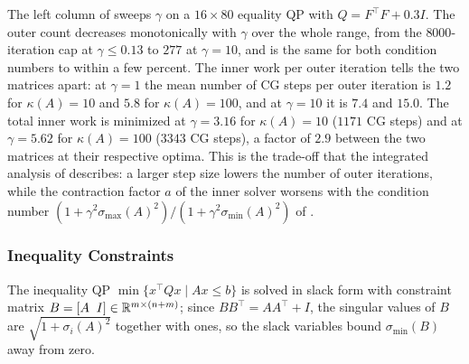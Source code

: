 \documentclass[11pt]{article}
\begin{document}
The left column of  sweeps $\gamma$ on a $16 \times 80$ equality QP with $Q = F^\top F + 0.3 I$.
The outer count decreases monotonically with $\gamma$ over the whole range, from the $8000$-iteration cap at $\gamma \leq 0.13$ to $277$ at $\gamma = 10$, and is the same for both condition numbers to within a few percent.
The inner work per outer iteration tells the two matrices apart: at $\gamma = 1$ the mean number of CG steps per outer iteration is $1.2$ for $\kappa(A) = 10$ and $5.8$ for $\kappa(A) = 100$, and at $\gamma = 10$ it is $7.4$ and $15.0$.
The total inner work is minimized at $\gamma = 3.16$ for $\kappa(A) = 10$ ($1171$ CG steps) and at $\gamma = 5.62$ for $\kappa(A) = 100$ ($3343$ CG steps), a factor of $2.9$ between the two matrices at their respective optima.
This is the trade-off that the integrated analysis of  describes: a larger step size lowers the number of outer iterations, while the contraction factor $a$ of the inner solver worsens with the condition number $(1 + \gamma^2 \sigma_{\max}(A)^2)/(1 + \gamma^2\sigma_{\min}(A)^2)$ of .

\subsubsection{Inequality Constraints}
The inequality QP $\min\{x^\top Q x \mid Ax \leq b\}$ is solved in slack form with constraint matrix $B = [A \;\; I] \in \mathbb{R}^{m \times (n + m)}$; since $B B^\top = A A^\top + I$, the singular values of $B$ are $\sqrt{1 + \sigma_i(A)^2}$ together with ones, so the slack variables bound $\sigma_{\min}(B)$ away from zero.
\end{document}
